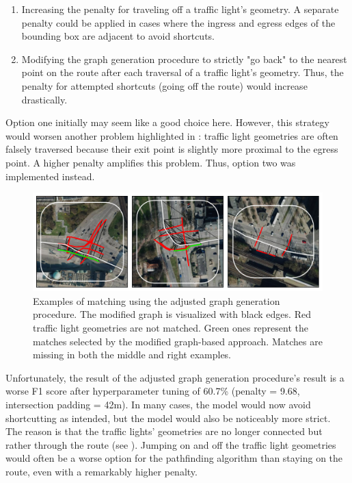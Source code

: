 \begin{enumerate}
    \item Increasing the penalty for traveling off a traffic light's geometry. A separate penalty could be applied in cases where the ingress and egress edges of the bounding box are adjacent to avoid shortcuts.
    \item  Modifying the graph generation procedure to strictly "go back" to the nearest point on the route after each traversal of a traffic light's geometry. Thus, the penalty for attempted shortcuts (going off the route) would increase drastically.
\end{enumerate}

Option one initially may seem like a good choice here. However, this strategy would worsen another problem highlighted in : traffic light geometries are often falsely traversed because their exit point is slightly more proximal to the egress point. A higher penalty amplifies this problem. Thus, option two was implemented instead. 

\begin{figure}[t]
\centering
\includegraphics[width=\linewidth]{images/matching-dijkstra-strict.pdf}
\caption{Examples of matching using the adjusted graph generation procedure. The modified graph is visualized with black edges. Red traffic light geometries are not matched. Green ones represent the matches selected by the modified graph-based approach. Matches are missing in both the middle and right examples.}
\label{fig:sg-selection-graph-strict}
\end{figure}

Unfortunately, the result of the adjusted graph generation procedure's result is a worse F1 score after hyperparameter tuning of 60.7\% (penalty = 9.68, intersection padding = 42m). In many cases, the model would now avoid shortcutting as intended, but the model would also be noticeably more strict. The reason is that the traffic lights' geometries are no longer connected but rather through the route (see ). Jumping on and off the traffic light geometries would often be a worse option for the pathfinding algorithm than staying on the route, even with a remarkably higher penalty. 

